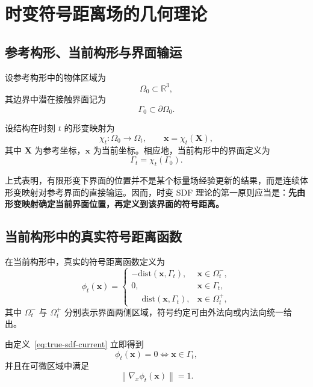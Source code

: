 \documentclass[12pt,a4paper]{ctexart}
\numberwithin{equation}{section}
\newcommand{\RR}{\mathbb{R}}
\newcommand{\bx}{\bm{x}}
\newcommand{\bX}{\bm{X}}
\newcommand{\gradx}{\nabla_{\!x}}
\newcommand{\dist}{\mathrm{dist}}
\newcommand{\norm}[1]{\left\lVert #1 \right\rVert}
\begin{document}
\section{时变符号距离场的几何理论}\label{sec:geom-theory}

\subsection{参考构形、当前构形与界面输运}

设参考构形中的物体区域为
\begin{equation}
\Omega_0 \subset \RR^3,
\end{equation}
其边界中潜在接触界面记为
\begin{equation}
\Gamma_0 \subset \partial\Omega_0.
\end{equation}

设结构在时刻 $t$ 的形变映射为
\begin{equation}
\chi_t : \Omega_0 \to \Omega_t,
\qquad
\bx = \chi_t(\bX),
\end{equation}
其中 $\bX$ 为参考坐标，$\bx$ 为当前坐标。相应地，当前构形中的界面定义为
\begin{equation}
\Gamma_t = \chi_t(\Gamma_0).
\end{equation}

上式表明，有限形变下界面的位置并不是某个标量场经验更新的结果，而是连续体形变映射对参考界面的直接输运。因而，时变 SDF 理论的第一原则应当是：\textbf{先由形变映射确定当前界面位置，再定义到该界面的符号距离。}

\subsection{当前构形中的真实符号距离函数}

在当前构形中，真实的符号距离函数定义为
\begin{equation}
\phi_t(\bx)=
\begin{cases}
-\dist(\bx,\Gamma_t), & \bx\in\Omega_t^{-},\\[1mm]
0, & \bx\in\Gamma_t,\\[1mm]
\phantom{-}\dist(\bx,\Gamma_t), & \bx\in\Omega_t^{+},
\end{cases}
\label{eq:true-sdf-current}
\end{equation}
其中 $\Omega_t^{-}$ 与 $\Omega_t^{+}$ 分别表示界面两侧区域，符号约定可由外法向或内法向统一给出。

由定义~\eqref{eq:true-sdf-current} 立即得到
\begin{equation}
\phi_t(\bx)=0 \iff \bx\in\Gamma_t,
\end{equation}
并且在可微区域中满足
\begin{equation}
\norm{\gradx \phi_t(\bx)}=1.
\label{eq:eikonal-current}
\end{equation}
\end{document}
